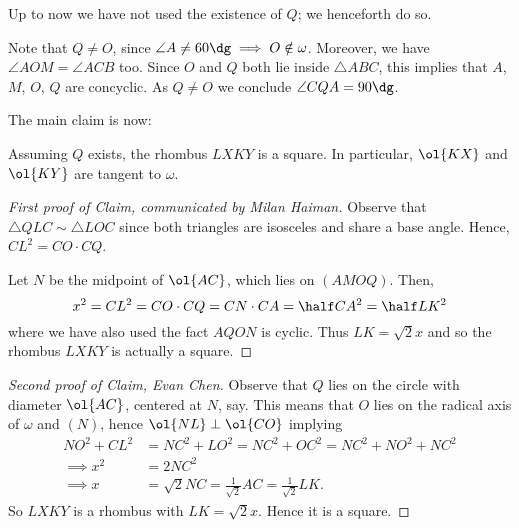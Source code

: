 \documentclass[11pt]{scrartcl}
\begin{document}
Up to now we have not used the existence of $Q$;
we henceforth do so.

Note that $Q \neq O$, since $\angle A \neq 60\dg \implies O \notin \omega$.
Moreover, we have $\angle AOM = \angle ACB$ too.
Since $O$ and $Q$ both lie inside $\triangle ABC$,
this implies that $A$, $M$, $O$, $Q$ are concyclic.
As $Q \neq O$ we conclude $\angle CQA = 90\dg$.

The main claim is now:
\begin{claim*}
  Assuming $Q$ exists, the rhombus $LXKY$ is a square.
  In particular, $\ol{KX}$ and $\ol{KY}$ are tangent to $\omega$.
\end{claim*}

\begin{proof}
  [First proof of Claim, communicated by Milan Haiman]
  Observe that $\triangle QLC \sim \triangle LOC$
  since both triangles are isosceles and share a base angle.
  Hence, $CL^2 = CO \cdot CQ$.

  Let $N$ be the midpoint of $\ol{AC}$,
  which lies on $(AMOQ)$.
  Then,
  \[ x^2 = CL^2 = CO \cdot CQ = CN \cdot CA = \half CA^2 = \half LK^2 \]
  where we have also used the fact $AQON$ is cyclic.
  Thus $LK = \sqrt2 x$ and so the rhombus $LXKY$ is
  actually a square.
\end{proof}

\begin{proof}
  [Second proof of Claim, Evan Chen]
  Observe that $Q$ lies on the circle with diameter $\ol{AC}$, centered at $N$, say.
  This means that $O$ lies on the radical axis of $\omega$ and $(N)$,
  hence $\ol{NL} \perp \ol{CO}$ implying
  \begin{align*}
    NO^2 + CL^2 &= NC^2 + LO^2
    = NC^2 + OC^2 = NC^2 + NO^2 + NC^2 \\
    \implies x^2 &= 2NC^2 \\
    \implies x &= \sqrt 2 NC = \frac{1}{\sqrt2} AC = \frac{1}{\sqrt2} LK.
  \end{align*}
  So $LXKY$ is a rhombus with $LK = \sqrt2 x$.
  Hence it is a square.
\end{proof}
\end{document}

